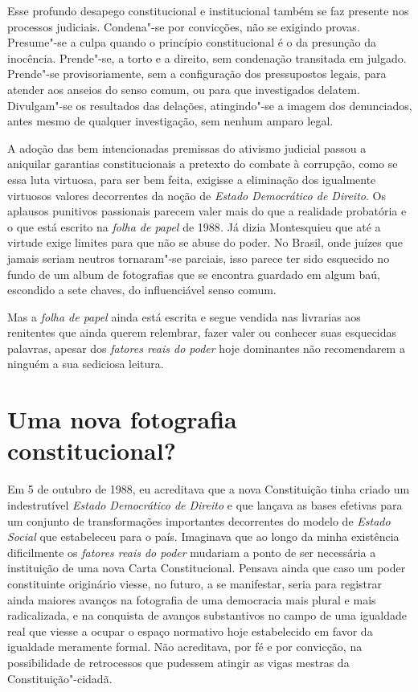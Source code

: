 Esse profundo desapego constitucional e institucional também se faz
presente nos processos judiciais. Condena"-se por convicções, não se
exigindo provas. Presume"-se a culpa quando o princípio constitucional é
o da presunção da inocência. Prende"-se, a torto e a direito, sem
condenação transitada em julgado. Prende"-se provisoriamente, sem a
configuração dos pressupostos legais, para atender aos anseios do senso
comum, ou para que investigados delatem. Divulgam"-se os resultados das
delações, atingindo"-se a imagem dos denunciados, antes mesmo de qualquer
investigação, sem nenhum amparo legal.

A adoção das bem intencionadas premissas do ativismo judicial passou a
aniquilar garantias constitucionais a pretexto do combate à corrupção,
como se essa luta virtuosa, para ser bem feita, exigisse a eliminação
dos igualmente virtuosos valores decorrentes da noção de \emph{Estado
Democrático de Direito}. Os aplausos punitivos passionais parecem valer
mais do que a realidade probatória e o que está escrito na \emph{folha
de papel} de 1988\emph{.} Já dizia Montesquieu que até a virtude exige
limites para que não se abuse do poder. No Brasil, onde juízes que
jamais seriam neutros tornaram"-se parciais, isso parece ter sido
esquecido no fundo de um album de fotografias que se encontra guardado
em algum baú, escondido a sete chaves, do influenciável senso comum.

Mas a \emph{folha de papel} ainda está escrita e segue vendida nas
livrarias aos renitentes que ainda querem relembrar, fazer valer ou
conhecer suas esquecidas palavras, apesar dos \emph{fatores reais do
poder} hoje dominantes não recomendarem a ninguém a sua sediciosa
leitura.

\section{Uma nova fotografia constitucional?}

Em 5 de outubro de 1988, eu acreditava que a nova Constituição tinha
criado um indestrutível \emph{Estado Democrático de Direito} e que
lançava as bases efetivas para um conjunto de transformações importantes
decorrentes do modelo de \emph{Estado Social} que estabeleceu para o
país. Imaginava que ao longo da minha existência dificilmente os
\emph{fatores reais do poder} mudariam a ponto de ser necessária a
instituição de uma nova Carta Constitucional. Pensava ainda que caso um
poder constituinte originário viesse, no futuro, a se manifestar, seria
para registrar ainda maiores avanços na fotografia de uma democracia
mais plural e mais radicalizada, e na conquista de avanços substantivos
no campo de uma igualdade real que viesse a ocupar o espaço normativo
hoje estabelecido em favor da igualdade meramente formal. Não
acreditava, por fé e por convicção, na possibilidade de retrocessos que
pudessem atingir as vigas mestras da Constituição"-cidadã.

